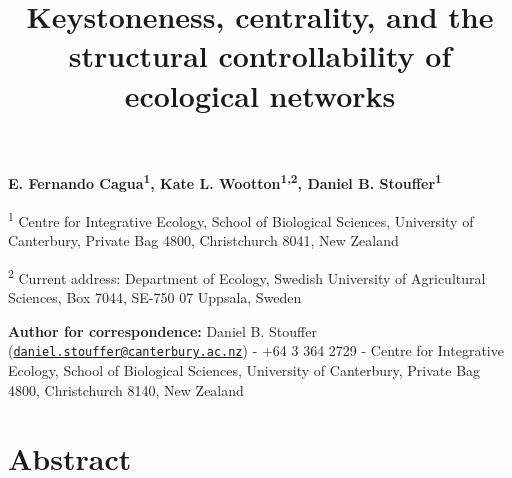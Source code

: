 \documentclass[a4paper]{artikel1}
\title{Keystoneness, centrality, and the structural controllability of
ecological networks}
\author{}
\date{}
\theoremstyle{definition}
\theoremstyle{definition}
\theoremstyle{definition}
\theoremstyle{remark}
\begin{document}
\maketitle

\doublespacing
\linenumbers

\textbf{E. Fernando Cagua\textsuperscript{1}, Kate L.
Wootton\textsuperscript{1,2}, Daniel B. Stouffer\textsuperscript{1}}

\textsuperscript{1} Centre for Integrative Ecology, School of Biological
Sciences, University of Canterbury, Private Bag 4800, Christchurch 8041,
New Zealand

\textsuperscript{2} Current address: Department of Ecology, Swedish
University of Agricultural Sciences, Box 7044, SE-750 07 Uppsala, Sweden

\textbf{Author for correspondence:} Daniel B. Stouffer
(\href{mailto:daniel.stouffer@canterbury.ac.nz}{\nolinkurl{daniel.stouffer@canterbury.ac.nz}})
- +64 3 364 2729 - Centre for Integrative Ecology, School of Biological
Sciences, University of Canterbury, Private Bag 4800, Christchurch 8140,
New Zealand

\clearpage

\section{Abstract}\label{abstract}
\end{document}
